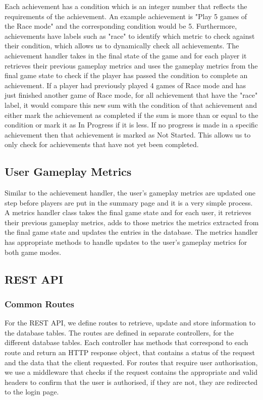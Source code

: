 \documentclass{l4proj}
\begin{document}
Each achievement has a condition which is an integer number that reflects the requirements of the achievement. An example achievement is "Play 5 games of the Race mode" and the corresponding condition would be 5. Furthermore, achievements have labels such as "race" to identify which metric to check against their condition, which allows us to dynamically check all achievements. The achievement handler takes in the final state of the game and for each player it retrieves their previous gameplay metrics and uses the gameplay metrics from the final game state to check if the player has passed the condition to complete an achievement. If a player had previously played 4 games of Race mode and has just finished another game of Race mode, for all achievement that have the "race" label, it would compare this new sum with the condition of that achievement and either mark the achievement as completed if the sum is more than or equal to the condition or mark it as In Progress if it is less. If no progress is made in a specific achievement then that achievement is marked as Not Started. This allows us to only check for achievements that have not yet been completed.

\subsection{User Gameplay Metrics}
Similar to the achievement handler, the user's gameplay metrics are updated one step before players are put in the summary page and it is a very simple process. A metrics handler class takes the final game state and for each user, it retrieves their previous gameplay metrics, adds to those metrics the metrics extracted from the final game state and updates the entries in the database. The metrics handler has appropriate methods to handle updates to the user's gameplay metrics for both game modes.

\subsection{REST API}

\subsubsection{Common Routes}
For the REST API, we define routes to retrieve, update and store information to the database tables. The routes are defined in separate controllers, for the different database tables. Each controller has methods that correspond to each route and return an HTTP response object, that contains a status of the request and the data that the client requested. For routes that require user authorisation, we use a middleware that checks if the request contains the appropriate and valid headers to confirm that the user is authorised, if they are not, they are redirected to the login page. 
\end{document}
